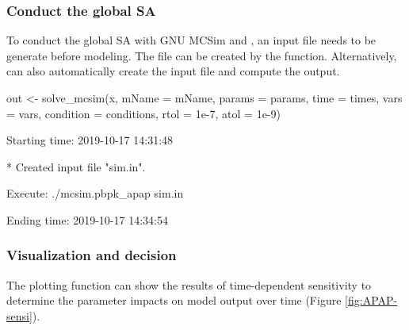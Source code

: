 \hypertarget{conduct-the-global-sa}{%
\subsubsection{Conduct the global SA}\label{conduct-the-global-sa}}

To conduct the global SA with GNU MCSim and , an input
file needs to be generate before modeling. The file can be created by
the  function. Alternatively, 
can also automatically create the input file and compute the output.

\begin{Schunk}
\begin{Sinput}
out <- solve_mcsim(x, mName = mName,
                   params = params, 
                   time = times, 
                   vars = vars,
                   condition = conditions, 
                   rtol = 1e-7, atol = 1e-9)
\end{Sinput}
\begin{Soutput}
  Starting time: 2019-10-17 14:31:48
\end{Soutput}
\begin{Soutput}
  * Created input file "sim.in".
\end{Soutput}
\begin{Soutput}
  Execute: ./mcsim.pbpk_apap sim.in
\end{Soutput}
\begin{Soutput}
  Ending time: 2019-10-17 14:34:54
\end{Soutput}
\end{Schunk}

\hypertarget{visualization-and-decision}{%
\subsubsection{Visualization and
decision}\label{visualization-and-decision}}

The plotting function can show the results of time-dependent sensitivity
to determine the parameter impacts on model output over time (Figure
\ref{fig:APAP-sensi}).

